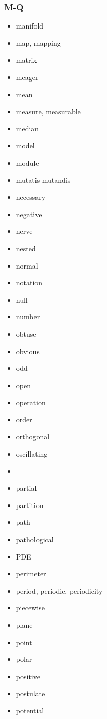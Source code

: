 \documentclass[12pt]{article}
\begin{document}
\subsubsection*{M-Q}

\begin{multicols}{3}{
\begin{itemize}
\item manifold
\item map, mapping
\item matrix
\item meager
\item mean
\item measure, measurable
\item median
\item model
\item module
\item mutatis mutandis
\item necessary
\item negative
\item nerve
\item nested
\item normal
\item notation
\item null
\item number
\item obtuse
\item obvious
\item odd
\item open
\item operation
\item order
\item orthogonal
\item oscillating
\item {}
\item partial
\item partition
\item path
\item pathological
\item PDE
\item perimeter
\item period, periodic, periodicity
\item piecewise
\item plane
\item point
\item polar
\item positive
\item postulate
\item potential

\end{itemize}}
\end{multicols}
\end{document}
